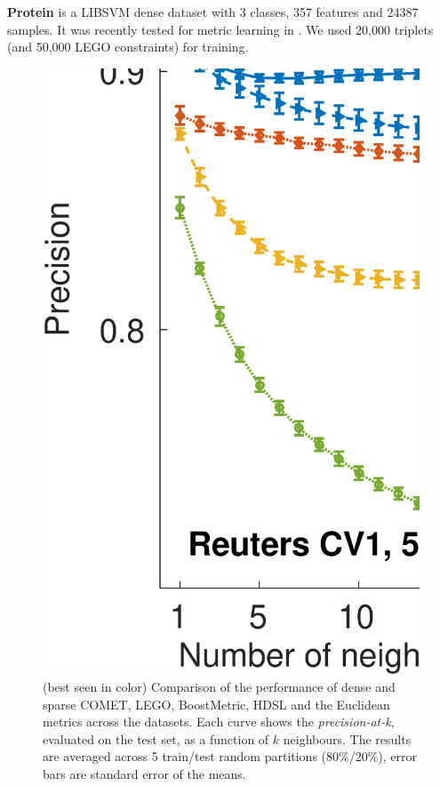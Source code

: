 \documentclass[twoside,11pt]{article}
\begin{document}
\textbf{Protein} is a LIBSVM \citep{libsvm} dense dataset with 3 classes, 357 features and 24387 samples. It was recently tested for metric learning in \citep{qian}. We used 20,000 triplets (and 50,000 LEGO constraints) for training.
\begin{figure}[ht]
\centering
\includegraphics[width=12cm]{Precision_at_K_all_datasets}
\captionsetup{font=small}
\caption{(best seen in color) Comparison of the performance of dense and sparse COMET, LEGO, BoostMetric, HDSL and the Euclidean metrics across the datasets. Each curve shows the \textit{precision-at-k}, evaluated on the test set, as a function of $k$ neighbours. The results are averaged across 5 train/test random partitions (80\%/20\%), error bars are standard error of the means.}\label{precFig}
\end{figure}
\end{document}
